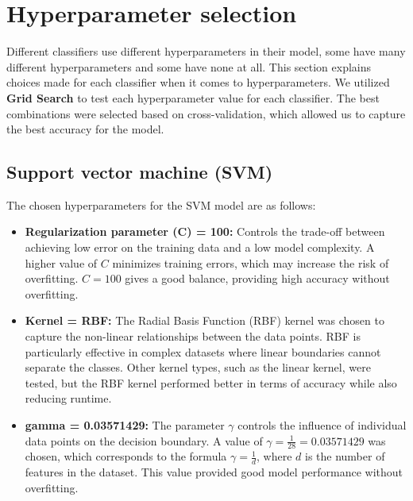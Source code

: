 \section{Hyperparameter selection}
Different classifiers use different hyperparameters in their model, some have many different hyperparameters and some have none at all. 
This section explains choices made for each classifier when it comes to hyperparameters.
We utilized \textbf{Grid Search} to test each hyperparameter value for each classifier. The best combinations were selected based on cross-validation, which allowed us to capture the best accuracy for the model.

\subsection{Support vector machine (SVM)}

The chosen hyperparameters for the SVM model are as follows:

\begin{itemize}
    \item \textbf{Regularization parameter (C) = 100:} Controls the trade-off between achieving low error on the training data and a low model complexity. A higher value of \(C\) minimizes training errors, which may increase the risk of overfitting. \(C = 100\) gives a good balance, providing high accuracy without overfitting.
    
    \item \textbf{Kernel = RBF:} The Radial Basis Function (RBF) kernel was chosen to capture the non-linear relationships between the data points. RBF is particularly effective in complex datasets where linear boundaries cannot separate the classes. Other kernel types, such as the linear kernel, were tested, but the RBF kernel performed better in terms of accuracy while also reducing runtime.
    
    \item \textbf{gamma = 0.03571429:} The parameter \(\gamma\) controls the influence of individual data points on the decision boundary. A value of \(\gamma = \frac{1}{28} = 0.03571429\) was chosen, which corresponds to the formula \(\gamma = \frac{1}{d}\), where \(d\) is the number of features in the dataset. This value provided good model performance without overfitting.
\end{itemize}

